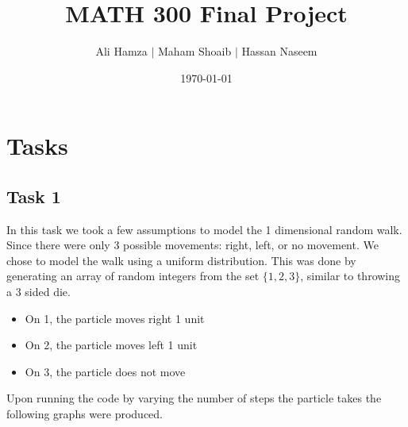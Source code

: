 \documentclass{article}
\title{\textbf{MATH 300 Final Project}}
\author{Ali Hamza $|$ Maham Shoaib $|$ Hassan Naseem}
\date{\today}
\begin{document}
\maketitle

\section{Tasks}
\subsection{Task 1}
In this task we took a few assumptions to model the 1 dimensional random walk. Since there 
were only 3 possible movements: right, left, or no movement. We chose to model the walk using a 
uniform distribution. This was done by generating an array of random integers from the set $\{1,2,3\}$, similar to 
throwing a 3 sided die.
\begin{itemize}
    \item On 1, the particle moves right 1 unit
    \item On 2, the particle moves left 1 unit
    \item On 3, the particle does not move
\end{itemize}
Upon running the code by varying the number of steps the particle takes the following graphs
were produced.
\end{document}
